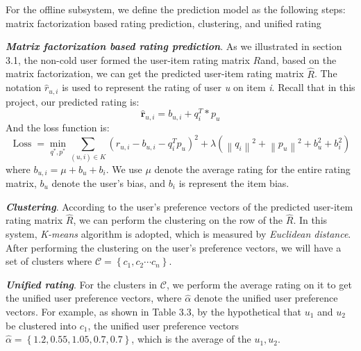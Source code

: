 For the offline subsystem, we define the prediction model as the following steps: matrix factorization based rating prediction, clustering, and unified rating

\textbf{\textit{Matrix factorization based rating prediction}}. As we illustrated in section 3.1, the non-cold user formed the user-item rating matrix $ R $and, based on the matrix factorization, we can get the predicted user-item rating matrix $\hat{R}$. The notation $\hat{r}_{u,i}$ is used to represent the rating of user \textit{u} on item \textit{i}. Recall that in this project, our predicted rating is:
\begin{equation}
    \hat{\boldsymbol{r}}_{u,i}=b_{u,i}+q_{i}^{T} * p_{u}
\end{equation}
And the loss function is:
\begin{equation}
    \operatorname{Loss}=\min _{q^{*}, p^{*}} \sum_{(u, i) \in K}\left(r_{u,i}-b_{u,i}-q_{i}^{T}p_{u}\right)^{2}+\lambda \left(\left\|q_{i}\right\|^{2}+\left\|p_{u}\right\|^{2}+b_{u}^{2}+b_{i}^{2}\right)
\end{equation}
where $b_{u,i} = \mu+b_{u}+b_{i}$. We use $\mu$ denote the average rating for the entire rating matrix, $b_{u}$ denote the user's bias, and $b_{i}$ is represent the item bias.

\textbf{\textit{Clustering}}. According to the user’s preference vectors of the predicted user-item rating matrix $\hat{R}$, we can perform the clustering on the row of the $\hat{R}$.  In this system, \textit{K-means} algorithm is adopted, which is measured by \textit{Euclidean distance}. After performing the clustering on the user’s preference vectors, we will have a set of clusters where $\mathcal{C}=\left \{ c_{1},c_{2}\cdots c_{n} \right \}$.

\textbf{\textit{Unified rating}}. For the clusters in $\mathcal{C}$, we perform the average rating on it to get the unified user preference vectors, where $\hat{\alpha}$ denote the unified user preference vectors. For example, as shown in Table 3.3, by the hypothetical that $u_{1}$ and $u_{2}$ be clustered into $ c_{1}$, the unified user preference vectors $ \hat{\alpha}=\left \{ 1.2,0.55, 1.05,0.7, 0.7 \right \}$, which is the average of the $u_{1},u_{2}$.


